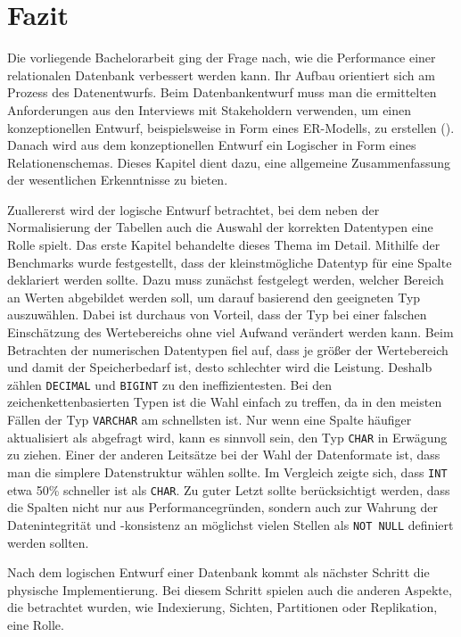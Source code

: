\chapter{Fazit}\label{ch:fazit}

Die vorliegende Bachelorarbeit ging der Frage nach, wie die Performance einer relationalen Datenbank verbessert werden kann.
Ihr Aufbau orientiert sich am Prozess des Datenentwurfs.
Beim Datenbankentwurf muss man die ermittelten Anforderungen aus den Interviews mit Stakeholdern verwenden, um einen konzeptionellen Entwurf, beispielsweise in Form eines ER-Modells, zu erstellen (\cite{db_entwurf_erklaerung}).
Danach wird aus dem konzeptionellen Entwurf ein Logischer in Form eines Relationenschemas.
Dieses Kapitel dient dazu, eine allgemeine Zusammenfassung der wesentlichen Erkenntnisse zu bieten.

Zuallererst wird der logische Entwurf betrachtet, bei dem neben der Normalisierung der Tabellen auch die Auswahl der korrekten Datentypen eine Rolle spielt.
Das erste Kapitel behandelte dieses Thema im Detail.
Mithilfe der Benchmarks wurde festgestellt, dass der kleinstmögliche Datentyp für eine Spalte deklariert werden sollte.
Dazu muss zunächst festgelegt werden, welcher Bereich an Werten abgebildet werden soll, um darauf basierend den geeigneten Typ auszuwählen.
Dabei ist durchaus von Vorteil, dass der Typ bei einer falschen Einschätzung des Wertebereichs ohne viel Aufwand verändert werden kann.
Beim Betrachten der numerischen Datentypen fiel auf, dass je größer der Wertebereich und damit der Speicherbedarf ist, desto schlechter wird die Leistung.
Deshalb zählen \texttt{DECIMAL} und \texttt{BIGINT} zu den ineffizientesten.
Bei den zeichenkettenbasierten Typen ist die Wahl einfach zu treffen, da in den meisten Fällen der Typ \texttt{VARCHAR} am schnellsten ist.
Nur wenn eine Spalte häufiger aktualisiert als abgefragt wird, kann es sinnvoll sein, den Typ \texttt{CHAR} in Erwägung zu ziehen.
Einer der anderen Leitsätze bei der Wahl der Datenformate ist, dass man die simplere Datenstruktur wählen sollte.
Im Vergleich zeigte sich, dass \texttt{INT} etwa 50\% schneller ist als \texttt{CHAR}.
Zu guter Letzt sollte berücksichtigt werden, dass die Spalten nicht nur aus Performancegründen, sondern auch zur Wahrung der Datenintegrität und -konsistenz an möglichst vielen Stellen als \texttt{NOT NULL} definiert werden sollten.

Nach dem logischen Entwurf einer Datenbank kommt als nächster Schritt die physische Implementierung.
Bei diesem Schritt spielen auch die anderen Aspekte, die betrachtet wurden, wie Indexierung, Sichten, Partitionen oder Replikation, eine Rolle.

